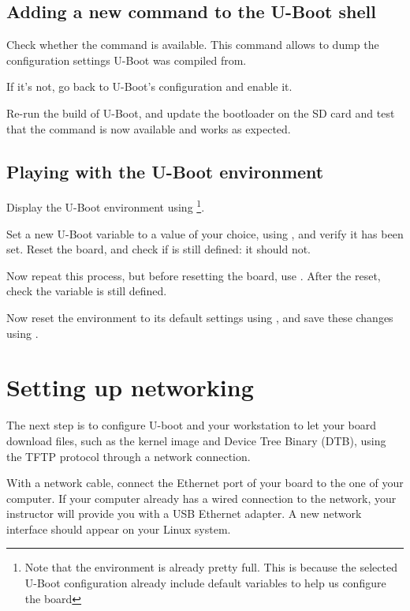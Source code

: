 \subsection{Adding a new command to the U-Boot shell}

Check whether the  command is available. This command
allows to dump the configuration settings U-Boot was compiled from.

If it's not, go back to U-Boot's configuration and enable it.

Re-run the build of U-Boot, and update the bootloader on the SD card
and test that the command is now available and works as expected.

\subsection{Playing with the U-Boot environment}

Display the U-Boot environment using \footnote{Note that
the environment is already pretty full. This is because the selected
U-Boot configuration already include default variables to help us configure
the board}.

Set a new U-Boot variable  to a value of your choice, using
, and verify it has been set. Reset the board, and check
if  is still defined: it should not.

Now repeat this process, but before resetting the board, use
. After the reset, check the  variable is
still defined.

Now reset the environment to its default settings using , and save these changes using .

\section{Setting up networking}

The next step is to configure U-boot and your workstation to let your
board download files, such as the kernel image and Device Tree Binary
(DTB), using the TFTP protocol through a network connection.

With a network cable, connect the Ethernet port of
your board to the one of your computer. If your computer already has a
wired connection to the network, your instructor will provide you with
a USB Ethernet adapter. A new network interface should appear on your
Linux system.

